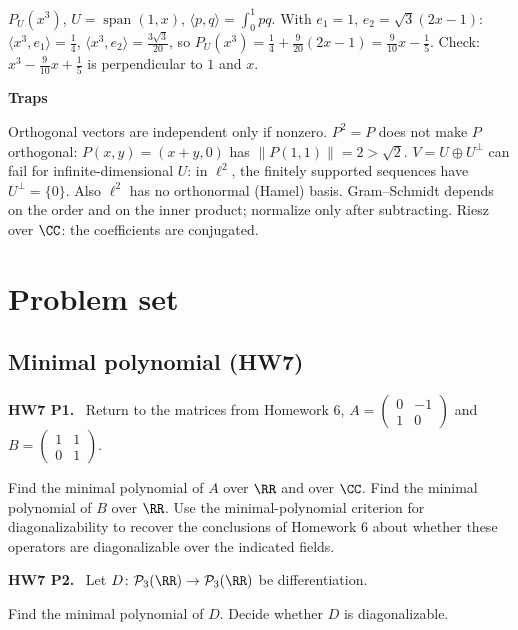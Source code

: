 \documentclass[10pt]{scrartcl}
\DeclareMathOperator{\spn}{span}
\newcommand{\PP}{\mathcal P}
\newcommand{\ip}[2]{\langle #1,#2\rangle}
\newenvironment{trapbox}{\begin{mdframed}[style=trapstyle]\textbf{\color{RawSienna}Traps}\begin{itemize}[itemsep=1pt,topsep=1pt]}{\end{itemize}\end{mdframed}}
\newenvironment{prob}{\par\bigskip\noindent\begin{minipage}{\linewidth}\setlength{\parskip}{4pt}}{\end{minipage}\par}
\begin{document}
\begin{example*}[Ex.~71]
  $P_U(x^3)$, $U=\spn(1,x)$, $\ip pq=\int_0^1pq$. With $e_1=1$, $e_2=\sqrt3(2x-1)$: $\ip{x^3}{e_1}=\frac14$, $\ip{x^3}{e_2}=\frac{3\sqrt3}{20}$, so $P_U(x^3)=\frac14+\frac9{20}(2x-1)=\frac9{10}x-\frac15$. Check: $x^3-\frac9{10}x+\frac15$ is perpendicular to $1$ and $x$.
\end{example*}

\begin{trapbox}
  \ii Orthogonal vectors are independent only if nonzero.
  \ii $P^2=P$ does not make $P$ orthogonal: $P(x,y)=(x+y,0)$ has $\|P(1,1)\|=2>\sqrt2$.
  \ii $V=U\oplus U^\perp$ can fail for infinite-dimensional $U$: in $\ell^2$, the finitely supported sequences have $U^\perp=\{0\}$. Also $\ell^2$ has no orthonormal (Hamel) basis.
  \ii Gram--Schmidt depends on the order and on the inner product; normalize only after subtracting.
  \ii Riesz over $\CC$: the coefficients are conjugated.
\end{trapbox}

\clearpage
\section{Problem set}

\subsection{Minimal polynomial (HW7)}

\begin{prob}
\textbf{HW7 P1. }\ Return to the matrices from Homework 6, $A=\begin{pmatrix}0&-1\\1&0\end{pmatrix}$ and $B=\begin{pmatrix}1&1\\0&1\end{pmatrix}$.
\begin{enumerate}[(a)]
  \ii Find the minimal polynomial of $A$ over $\RR$ and over $\CC$.
  \ii Find the minimal polynomial of $B$ over $\RR$.
  \ii Use the minimal-polynomial criterion for diagonalizability to recover the conclusions of Homework 6 about whether these operators are diagonalizable over the indicated fields.
\end{enumerate}
\end{prob}

\begin{prob}
\textbf{HW7 P2. }\ Let $D\colon\PP_3(\RR)\to\PP_3(\RR)$ be differentiation.
\begin{enumerate}[(a)]
  \ii Find the minimal polynomial of $D$.
  \ii Decide whether $D$ is diagonalizable.
\end{enumerate}
\end{prob}
\end{document}
